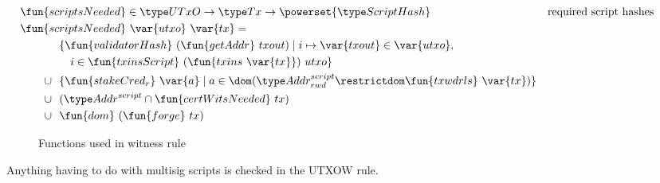 \begin{figure}[htb]
  \begin{align*}
      & \hspace{-1cm}\fun{scriptsNeeded} \in \UTxO \to \Tx \to
        \powerset{\ScriptHash}
      & \text{required script hashes} \\
      &  \hspace{-1cm}\fun{scriptsNeeded}~\var{utxo}~\var{tx} = \\
      & ~~\{ \fun{validatorHash}~(\fun{getAddr}~{txout}) \mid i \mapsto \var{txout} \in \var{utxo},\\
      & ~~~~~i\in\fun{txinsScript}~{(\fun{txins~\var{tx}})}~{utxo}\} \\
      \cup & ~~\{ \fun{stakeCred_{r}}~\var{a} \mid a \in \dom (\AddrRWDScr
             \restrictdom \fun{txwdrls}~\var{tx}) \} \\
        \cup & ~~(\AddrScr \cap \fun{certWitsNeeded}~{tx}) \\
        \cup & ~~\fun{dom}~(\fun{forge}~{tx})
  \end{align*}
  \caption{Functions used in witness rule}
  \label{fig:functions-witnesses}
\end{figure}

Anything having to do with multisig scripts is checked in the UTXOW rule.

